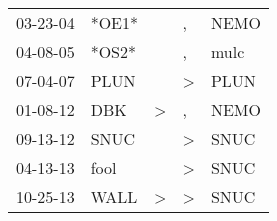 \begin{supertabular}{p{0.07\textwidth}p{0.06\textwidth}p{0.02\textwidth}p{0.02\textwidth}p{0.06\textwidth}}
 03-23-04\textsuperscript{} &                   *OE1* &               &             , &  NEMO\textsuperscript{} \\
 04-08-05\textsuperscript{} &                   *OS2* &               &             , &  mulc\textsuperscript{} \\
 07-04-07\textsuperscript{} &  PLUN\textsuperscript{} &               &  \textgreater &  PLUN\textsuperscript{} \\
 01-08-12\textsuperscript{} &   DBK\textsuperscript{} &  \textgreater &             , &  NEMO\textsuperscript{} \\
 09-13-12\textsuperscript{} &  SNUC\textsuperscript{} &               &  \textgreater &  SNUC\textsuperscript{} \\
 04-13-13\textsuperscript{} &  fool\textsuperscript{} &               &  \textgreater &  SNUC\textsuperscript{} \\
 10-25-13\textsuperscript{} &  WALL\textsuperscript{} &  \textgreater &  \textgreater &  SNUC\textsuperscript{} \\
\end{supertabular}
